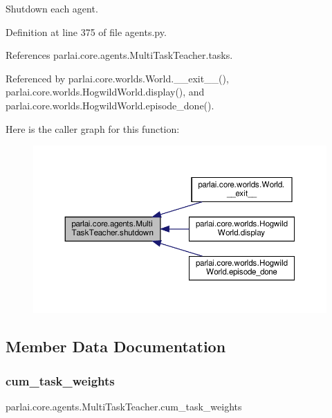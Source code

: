 \begin{DoxyVerb}Shutdown each agent.\end{DoxyVerb}
 

Definition at line 375 of file agents.\+py.



References parlai.\+core.\+agents.\+Multi\+Task\+Teacher.\+tasks.



Referenced by parlai.\+core.\+worlds.\+World.\+\_\+\+\_\+exit\+\_\+\+\_\+(), parlai.\+core.\+worlds.\+Hogwild\+World.\+display(), and parlai.\+core.\+worlds.\+Hogwild\+World.\+episode\+\_\+done().

Here is the caller graph for this function\+:
\nopagebreak
\begin{figure}[H]
\begin{center}
\leavevmode
\includegraphics[width=350pt]{classparlai_1_1core_1_1agents_1_1MultiTaskTeacher_a259dd3bec3f24669e835d8fbac657c3b_icgraph}
\end{center}
\end{figure}


\subsection{Member Data Documentation}
\mbox{\label{classparlai_1_1core_1_1agents_1_1MultiTaskTeacher_a1060c15dbbbe7fedfb89ba94969c5b99}} 
\subsubsection{\texorpdfstring{cum\+\_\+task\+\_\+weights}{cum\_task\_weights}}
{\footnotesize\ttfamily parlai.\+core.\+agents.\+Multi\+Task\+Teacher.\+cum\+\_\+task\+\_\+weights}



